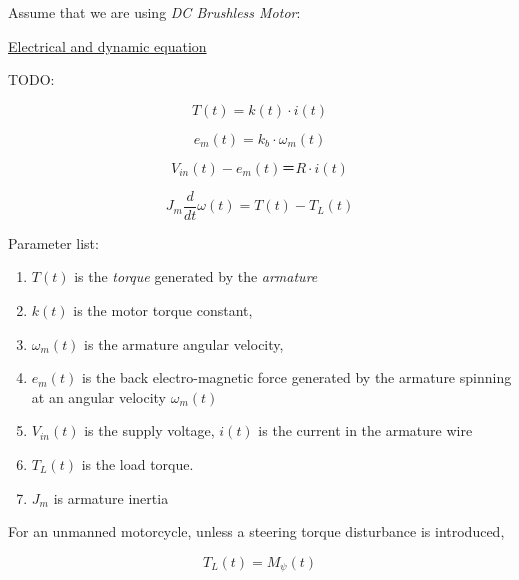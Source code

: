 \documentclass[11pt]{article}
\begin{document}
Assume that we are using {\em DC Brushless Motor}:

\href{http://ctms.engin.umich.edu/CTMS/index.php?example=MotorSpeed&section=SystemModeling#3}{Electrical and dynamic equation}

TODO:

\begin{equation}
    T(t) = k(t) \cdot i(t)
\end{equation}

\begin{equation}
    e_{m}(t) = k_{b} \cdot \omega_{m}(t)
\end{equation}

\begin{equation}
    V_{in}(t) - e_{m}(t) ＝ R \cdot i(t)
\end{equation}

\begin{equation}
    J_{m}\frac{d}{dt}\omega(t) = T(t) - T_{L}(t)
\end{equation}

Parameter list:
\begin{enumerate}
\item  $T(t)$ is the {\em torque} generated by the {\em armature}

\item $k(t)$ is the motor torque constant,
\item $\omega_{m}(t)$ is the armature angular velocity,
\item $e_{m}(t)$ is the back electro-magnetic force
generated by the armature spinning at an angular velocity $\omega_{m}(t)$
\item $V_{in}(t)$ is the supply voltage, $i(t)$ is the current in the armature wire
\item $T_{L}(t)$ is the load torque.
\item $J_{m}$ is armature inertia
\end{enumerate}


For an unmanned motorcycle, unless a steering torque disturbance is introduced,

\begin{equation}
    T_{L}(t) = M_{\psi}(t)
\end{equation}



\end{document}
